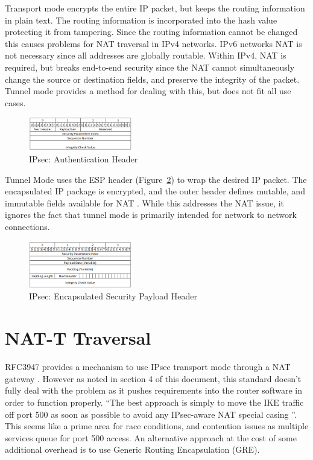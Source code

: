 \documentclass[conference,12pt]{IEEEtran}
\begin{document}
Transport mode encrypts the entire IP packet, but keeps the routing information
in plain text. The routing information is incorporated into the hash
value protecting it from tampering. Since the routing information cannot be
changed this causes problems for NAT traversal in IPv4 networks.  IPv6
networks NAT is not necessary since all addresses are globally routable.
Within IPv4, NAT is required, but breaks end-to-end security since the
NAT cannot simultaneously change the source or destination fields, and preserve the integrity
of the packet. Tunnel mode provides a method for dealing with this, but does not
fit all use cases. 

\begin{figure}
\centering
\includegraphics[width=0.4\textwidth]{AH.png}
\caption{IPsec: Authentication Header}
\label{fig:ah}
\end{figure}

Tunnel Mode uses the ESP header (Figure~\ref{fig:esp}) to wrap the desired IP
packet. The encapsulated IP package is encrypted, and the outer header defines
mutable, and immutable fields available for NAT \autocite{rfc4301}. While this
addresses the NAT issue, it ignores the fact that tunnel mode is primarily
intended for network to network connections.   

\begin{figure}
\centering
\includegraphics[width=0.4\textwidth]{ESP.png}
\caption{IPsec: Encapsulated Security Payload Header}
\label{fig:esp}
\end{figure}

\section{NAT-T Traversal}
RFC3947 provides a mechanism to use IPsec transport mode through a NAT gateway
\autocite{rfc3947}. However as noted in section 4 of this document, this standard doesn't
fully deal with the problem as it pushes requirements into the router software
in order to function properly. ``The best approach is simply to move the IKE traffic off port 500 
as soon as possible to avoid any IPsec-aware NAT special casing
\autocite{rfc3947}''.  This seems like a prime area for race
conditions, and contention issues as multiple services queue for port 500
access.  An alternative approach at the cost of
some additional overhead is to use Generic Routing Encapsulation (GRE).
\end{document}
